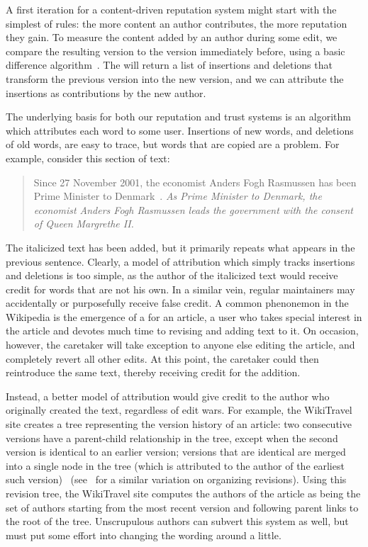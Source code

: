 
A first iteration for a content-driven reputation system
might start with the simplest of rules: the more content
an author contributes, the more reputation they gain.
To measure the content added by an author during some edit,
we compare the resulting version to the version immediately before,
using a basic difference algorithm~\cite{Myers86,TichyEditDist,BurnsLong97}.
The  will return a list of insertions
and deletions that transform the previous version into
the new version, and we can attribute the insertions
as contributions by the new author.

The underlying basis for both our reputation and trust systems
is an algorithm which attributes each word to some user.
Insertions of new words, and deletions of old words,
are easy to trace, but words that are copied are a problem.
For example, consider this section of text:
%
\begin{quote}
Since 27 November 2001, the economist Anders Fogh Rasmussen
has been Prime Minister to Denmark~\cite{wiki:Denmark-Fogh}.
\textit{As Prime Minister to Denmark, the economist Anders Fogh Rasmussen
leads the government with the consent of Queen Margrethe II.}
\end{quote}
%
The italicized text has been added, but it primarily repeats
what appears in the previous sentence.
Clearly, a model of attribution which simply tracks insertions
and deletions is too simple, as the author of the italicized
text would receive credit for words that are not his own.
In a similar vein,
regular maintainers may accidentally or purposefully receive
false credit.
A common phenonemon in the Wikipedia is the emergence
of a  for an article, a user who takes
special interest in the article and devotes much time
to revising and adding text to it.
On occasion, however, the caretaker will take exception to
anyone else editing the article, and completely revert all other edits.
At this point, the caretaker could then reintroduce
the same text, thereby receiving credit for the addition.

Instead, a better model of attribution would give credit
to the author who originally created the text,
regardless of edit wars.
For example, the WikiTravel site creates a tree representing
the version history of an article: two consecutive versions
have a parent-child relationship in the tree, except when
the second version is identical to an earlier version;
versions that are identical are merged into a single node
in the tree (which is attributed to the author of the earliest
such version)~\cite{WikiTravelAuthorship}
(see~\cite{Sabel2007} for a similar variation on organizing revisions).
Using this revision tree, the WikiTravel site computes the
authors of the article as being the set of authors starting
from the most recent version and following parent links
to the root of the tree.
Unscrupulous authors can subvert this system as
well, but must put some effort into changing
the wording around a little.

